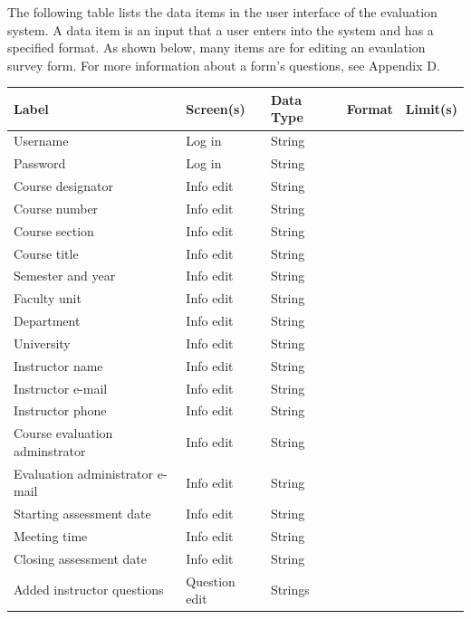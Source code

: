 \documentclass{article}
\begin{document}
The following table lists the data items in the user interface of the evaluation system. A data item is an input that a user enters into the system and has a specified format. As shown below, many items are for editing an evaulation survey form. For more information about a form's questions, see Appendix D.

\vspace{2in}

\begin{center}
\begin{tabular}{|p{4.4cm}|p{2.2cm}|p{2cm}|p{4cm}|p{4cm}|} 
\hline
\textbf{Label} & \textbf{Screen(s)} & \textbf{Data Type} & \textbf{Format} & \textbf{Limit(s)} \\
\hline
Username & Log in & String & & \\ 
\hline
Password & Log in & String & & \\ 
\hline
Course designator & Info edit & String & & \\ 
\hline
Course number & Info edit & String & & \\ 
\hline
Course section & Info edit & String & & \\ 
\hline
Course title & Info edit & String & & \\ 
\hline
Semester and year & Info edit & String & & \\ 
\hline
Faculty unit & Info edit & String & & \\ 
\hline
Department & Info edit & String & & \\ 
\hline
University & Info edit & String & & \\ 
\hline
Instructor name & Info edit & String & & \\ 
\hline
Instructor e-mail & Info edit & String & & \\ 
\hline
Instructor phone & Info edit & String & & \\ 
\hline
Course evaluation adminstrator & Info edit & String & & \\ 
\hline
Evaluation administrator e-mail & Info edit & String & & \\ 
\hline
Starting assessment date & Info edit & String & & \\ 
\hline
Meeting time & Info edit & String & & \\ 
\hline
Closing assessment date & Info edit & String & & \\ 
\hline
Added instructor questions & Question edit & Strings & & \\ 

\end{tabular}
\end{center}
\end{document}
